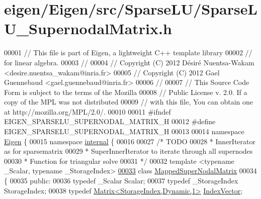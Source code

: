 \hypertarget{eigen_2_eigen_2src_2_sparse_l_u_2_sparse_l_u___supernodal_matrix_8h_source}{}\section{eigen/\+Eigen/src/\+Sparse\+L\+U/\+Sparse\+L\+U\+\_\+\+Supernodal\+Matrix.h}
\label{eigen_2_eigen_2src_2_sparse_l_u_2_sparse_l_u___supernodal_matrix_8h_source}

\begin{DoxyCode}
00001 \textcolor{comment}{// This file is part of Eigen, a lightweight C++ template library}
00002 \textcolor{comment}{// for linear algebra.}
00003 \textcolor{comment}{//}
00004 \textcolor{comment}{// Copyright (C) 2012 Désiré Nuentsa-Wakam <desire.nuentsa\_wakam@inria.fr>}
00005 \textcolor{comment}{// Copyright (C) 2012 Gael Guennebaud <gael.guennebaud@inria.fr>}
00006 \textcolor{comment}{//}
00007 \textcolor{comment}{// This Source Code Form is subject to the terms of the Mozilla}
00008 \textcolor{comment}{// Public License v. 2.0. If a copy of the MPL was not distributed}
00009 \textcolor{comment}{// with this file, You can obtain one at http://mozilla.org/MPL/2.0/.}
00010 
00011 \textcolor{preprocessor}{#ifndef EIGEN\_SPARSELU\_SUPERNODAL\_MATRIX\_H}
00012 \textcolor{preprocessor}{#define EIGEN\_SPARSELU\_SUPERNODAL\_MATRIX\_H}
00013 
00014 \textcolor{keyword}{namespace }\hyperlink{namespace_eigen}{Eigen} \{
00015 \textcolor{keyword}{namespace }\hyperlink{namespaceinternal}{internal} \{
00016 
00027 \textcolor{comment}{/* TODO}
00028 \textcolor{comment}{ * InnerIterator as for sparsematrix }
00029 \textcolor{comment}{ * SuperInnerIterator to iterate through all supernodes }
00030 \textcolor{comment}{ * Function for triangular solve}
00031 \textcolor{comment}{ */}
00032 \textcolor{keyword}{template} <\textcolor{keyword}{typename} \_Scalar, \textcolor{keyword}{typename} \_StorageIndex>
\hyperlink{group___sparse_l_u___module}{00033} \textcolor{keyword}{class }\hyperlink{group___sparse_l_u___module_class_eigen_1_1internal_1_1_mapped_super_nodal_matrix}{MappedSuperNodalMatrix}
00034 \{
00035   \textcolor{keyword}{public}:
00036     \textcolor{keyword}{typedef} \_Scalar Scalar; 
00037     \textcolor{keyword}{typedef} \_StorageIndex StorageIndex;
00038     \textcolor{keyword}{typedef} \hyperlink{group___core___module}{Matrix<StorageIndex,Dynamic,1>} 
      \hyperlink{group___core___module}{IndexVector};

\end{DoxyCode}
